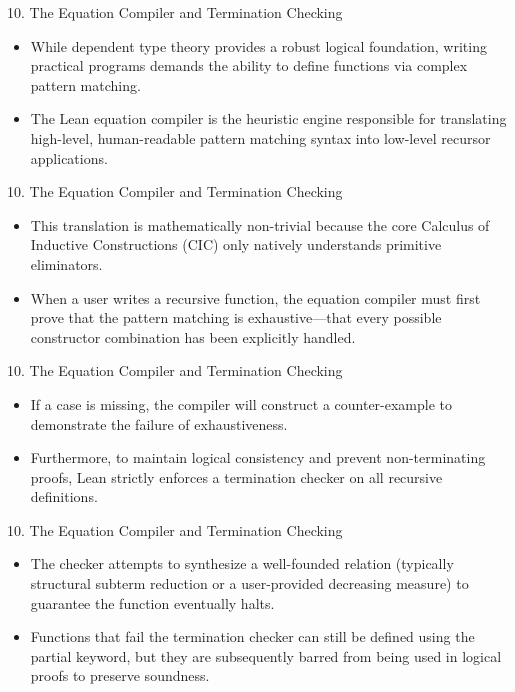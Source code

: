 \documentclass[10pt]{beamer}
\begin{document}
\begin{frame}{10. The Equation Compiler and Termination Checking}
\begin{itemize}\setlength{\itemsep}{1.5em}
  \item While dependent type theory provides a robust logical foundation, writing practical programs demands the ability to define functions via complex pattern matching.
  \item The Lean equation compiler is the heuristic engine responsible for translating high-level, human-readable pattern matching syntax into low-level recursor applications.
\end{itemize}
\end{frame}

\begin{frame}{10. The Equation Compiler and Termination Checking}
\begin{itemize}\setlength{\itemsep}{1.5em}
  \item This translation is mathematically non-trivial because the core Calculus of Inductive Constructions (CIC) only natively understands primitive eliminators.
  \item When a user writes a recursive function, the equation compiler must first prove that the pattern matching is exhaustive—that every possible constructor combination has been explicitly handled.
\end{itemize}
\end{frame}

\begin{frame}{10. The Equation Compiler and Termination Checking}
\begin{itemize}\setlength{\itemsep}{1.5em}
  \item If a case is missing, the compiler will construct a counter-example to demonstrate the failure of exhaustiveness.
  \item Furthermore, to maintain logical consistency and prevent non-terminating proofs, Lean strictly enforces a termination checker on all recursive definitions.
\end{itemize}
\end{frame}

\begin{frame}{10. The Equation Compiler and Termination Checking}
\begin{itemize}\setlength{\itemsep}{1.5em}
  \item The checker attempts to synthesize a well-founded relation (typically structural subterm reduction or a user-provided decreasing measure) to guarantee the function eventually halts.
  \item Functions that fail the termination checker can still be defined using the partial keyword, but they are subsequently barred from being used in logical proofs to preserve soundness.
\end{itemize}
\end{frame}
\end{document}
